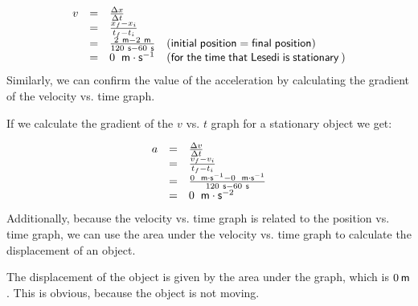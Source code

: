         \label{m38795*id69332}\nopagebreak\noindent{}
    \begin{equation}
    \begin{array}{cccc}\hfill v& =& \frac{\Delta x}{\Delta t}\hfill & \\ & =& \frac{{x}_{f}-{x}_{i}}{{t}_{f}-{t}_{i}}\hfill & \\ & =& \frac{2\phantom{\rule{3.33333pt}{0ex}}\mathsf{m}-2\phantom{\rule{3.33333pt}{0ex}}\mathsf{m}}{120\phantom{\rule{3.33333pt}{0ex}}\mathsf{s}-60\phantom{\rule{3.33333pt}{0ex}}\mathsf{s}}\hfill & \left(\mathsf{initial\; position}=\mathsf{final\; position}\right)\hfill \\ & =& 0\phantom{\rule{4pt}{0ex}}\phantom{\rule{0.166667em}{0ex}}\mathsf{m}\ensuremath{\cdot}{\mathsf{s}}^{-1}\hfill & \left(\mathsf{for\; the\; time\; that\; Lesedi\; is\; stationary}\phantom{\rule{2pt}{0ex}}\right)\hfill \end{array}
      \end{equation}
        \label{m38795*id69558}Similarly, we can confirm the value of the acceleration by calculating the gradient of the velocity vs. time graph.\par 
\label{m38795*notfhsst!!!underscore!!!id2005}
	\par
        \label{m38795*id69571}If we calculate the gradient of the $v$ vs. $t$ graph for a stationary object we get:\par 
        \label{m38795*id69594}\nopagebreak\noindent{}
          
    \begin{equation}
    \begin{array}{ccc}\hfill a& =& \frac{\Delta v}{\Delta t}\hfill \\ & =& \frac{{v}_{f}-{v}_{i}}{{t}_{f}-{t}_{i}}\hfill \\ & =& \frac{0\phantom{\rule{4pt}{0ex}}\phantom{\rule{0.166667em}{0ex}}\mathsf{m}\ensuremath{\cdot}{\mathsf{s}}^{-1}-0\phantom{\rule{4pt}{0ex}}\phantom{\rule{0.166667em}{0ex}}\mathsf{m}\ensuremath{\cdot}{\mathsf{s}}^{-1}}{120\phantom{\rule{3.33333pt}{0ex}}\mathsf{s}-60\phantom{\rule{3.33333pt}{0ex}}\mathsf{s}}\hfill \\ & =& 0\phantom{\rule{4pt}{0ex}}\phantom{\rule{0.166667em}{0ex}}\mathsf{m}\ensuremath{\cdot}{\mathsf{s}}^{-2}\hfill \end{array}
      \end{equation}
        \label{m38795*id69809}Additionally, because the velocity vs. time graph is related to the position vs. time graph, we can use the area under the velocity vs. time graph to calculate the displacement of an object.\par 
\label{m38795*notfhsst!!!underscore!!!id2134}
	\par
        \label{m38795*id69821}The displacement of the object is given by the area under the graph, which is $0\phantom{\rule{2pt}{0ex}}\mathsf{m}$. This is obvious, because the object is not moving.\par 
      \label{m38795*uid90}
